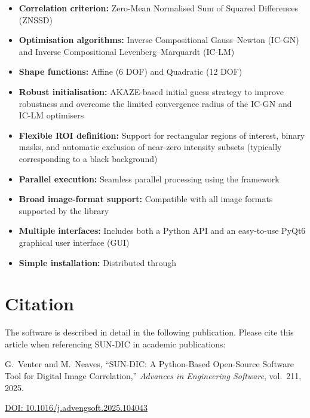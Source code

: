 \begin{itemize}
	\item \textbf{Correlation criterion:} Zero-Mean Normalised Sum of Squared Differences (ZNSSD)
	
	\item \textbf{Optimisation algorithms:} Inverse Compositional Gauss--Newton (IC-GN) and Inverse Compositional Levenberg--Marquardt (IC-LM)
	
	\item \textbf{Shape functions:} Affine (6 DOF) and Quadratic (12 DOF)
	
	\item \textbf{Robust initialisation:} AKAZE-based initial guess strategy to improve robustness and overcome the limited convergence radius of the IC-GN and IC-LM optimisers
	
	\item \textbf{Flexible ROI definition:} Support for rectangular regions of interest, binary masks, and automatic exclusion of near-zero intensity subsets (typically corresponding to a black background)
	
	\item \textbf{Parallel execution:} Seamless parallel processing using the  framework
	
	\item \textbf{Broad image-format support:} Compatible with all image formats supported by the  library
	
	\item \textbf{Multiple interfaces:} Includes both a Python API and an easy-to-use PyQt6 graphical user interface (GUI)
	
	\item \textbf{Simple installation:} Distributed through 

	
\end{itemize}

\section{Citation}

The software is described in detail in the following publication. Please cite this article when referencing SUN-DIC in academic publications:

\begin{grayquote}
	G.\ Venter and M.\ Neaves, ``SUN-DIC: A Python-Based Open-Source Software Tool for Digital Image Correlation,'' \textit{Advances in Engineering Software}, vol.\ 211, 2025.
	
	\href{https://doi.org/10.1016/j.advengsoft.2025.104043}{DOI: 10.1016/j.advengsoft.2025.104043}
\end{grayquote}

